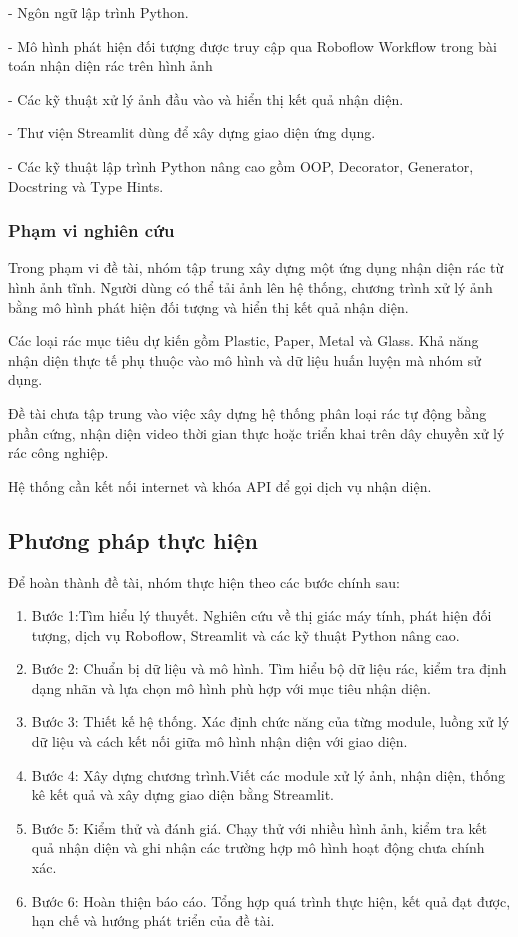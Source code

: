 \documentclass[a4paper,13pt]{extarticle}
\begin{document}
    - Ngôn ngữ lập trình Python.
    
    - Mô hình phát hiện đối tượng được truy cập qua Roboflow Workflow trong bài toán nhận diện rác trên hình ảnh   

    - Các kỹ thuật xử lý ảnh đầu vào và hiển thị kết quả nhận diện.
    
    - Thư viện Streamlit dùng để xây dựng giao diện ứng dụng.
    
    - Các kỹ thuật lập trình Python nâng cao gồm OOP, Decorator, Generator, Docstring và Type Hints.

\subsubsection{Phạm vi nghiên cứu}
Trong phạm vi đề tài, nhóm tập trung xây dựng một ứng dụng nhận diện rác từ hình ảnh tĩnh. Người dùng có thể tải ảnh lên hệ thống, chương trình xử lý ảnh bằng mô hình phát hiện đối tượng và hiển thị kết quả nhận diện.

Các loại rác mục tiêu dự kiến gồm Plastic, Paper, Metal và Glass. Khả năng nhận diện thực tế phụ thuộc vào mô hình và dữ liệu huấn luyện mà nhóm sử dụng.

Đề tài chưa tập trung vào việc xây dựng hệ thống phân loại rác tự động bằng phần cứng, nhận diện video thời gian thực hoặc triển khai trên dây chuyền xử lý rác công nghiệp.

Hệ thống cần kết nối internet và khóa API để gọi dịch vụ nhận diện.

\subsection{Phương pháp thực hiện}
Để hoàn thành đề tài, nhóm thực hiện theo các bước chính sau:

\begin{enumerate}
    \item Bước 1:Tìm hiểu lý thuyết. Nghiên cứu về thị giác máy tính, phát hiện đối tượng, dịch vụ Roboflow, Streamlit và các kỹ thuật Python nâng cao.
    \item Bước 2: Chuẩn bị dữ liệu và mô hình. Tìm hiểu bộ dữ liệu rác, kiểm tra định dạng nhãn và lựa chọn mô hình phù hợp với mục tiêu nhận diện.
    \item Bước 3: Thiết kế hệ thống. Xác định chức năng của từng module, luồng xử lý dữ liệu và cách kết nối giữa mô hình nhận diện với giao diện.
    \item Bước 4: Xây dựng chương trình.Viết các module xử lý ảnh, nhận diện, thống kê kết quả và xây dựng giao diện bằng Streamlit.
    \item Bước 5: Kiểm thử và đánh giá. Chạy thử với nhiều hình ảnh, kiểm tra kết quả nhận diện và ghi nhận các trường hợp mô hình hoạt động chưa chính xác.
    \item Bước 6: Hoàn thiện báo cáo. Tổng hợp quá trình thực hiện, kết quả đạt được, hạn chế và hướng phát triển của đề tài.
\end{enumerate}
\end{document}
